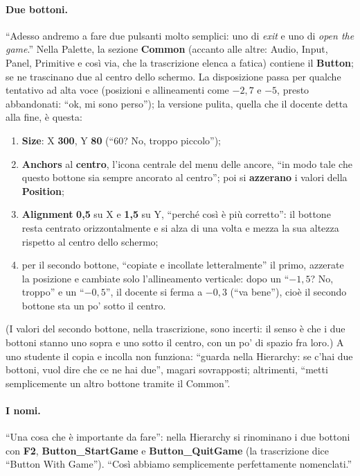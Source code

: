 \paragraph{Due bottoni.} ``Adesso andremo a fare due pulsanti molto semplici: uno di
\emph{exit} e uno di \emph{open the game}.'' Nella Palette, la sezione
\textbf{Common} (accanto alle altre: Audio, Input, Panel, Primitive e così via, che la
trascrizione elenca a fatica) contiene il \textbf{Button}; se ne trascinano due al centro
dello schermo. La disposizione passa per qualche tentativo ad alta voce (posizioni e
allineamenti come $-2{,}7$ e $-5$, presto abbandonati: ``ok, mi sono perso''); la versione
pulita, quella che il docente detta alla fine, è questa:
\begin{enumerate}
  \item \textbf{Size}: X \textbf{300}, Y \textbf{80} (``60? No, troppo piccolo'');
  \item \textbf{Anchors} al \textbf{centro}, l'icona centrale del menu delle ancore, ``in
        modo tale che questo bottone sia sempre ancorato al centro''; poi si
        \textbf{azzerano} i valori della \textbf{Position};
  \item \textbf{Alignment} \textbf{0,5} su X e \textbf{1,5} su Y, ``perché così è più
        corretto'': il bottone resta centrato orizzontalmente e si alza di una volta e
        mezza la sua altezza rispetto al centro dello schermo;
  \item per il secondo bottone, ``copiate e incollate letteralmente'' il primo, azzerate
        la posizione e cambiate solo l'allineamento verticale: dopo un ``$-1{,}5$? No,
        troppo'' e un ``$-0{,}5$'', il docente si ferma a \textbf{$-0{,}3$} (``va bene''),
        cioè il secondo bottone sta un po' sotto il centro.
\end{enumerate}
(I valori del secondo bottone, nella trascrizione, sono incerti: il senso è che i due
bottoni stanno uno sopra e uno sotto il centro, con un po' di spazio fra loro.) A uno
studente il copia e incolla non funziona: ``guarda nella Hierarchy: se c'hai due bottoni,
vuol dire che ce ne hai due'', magari sovrapposti; altrimenti, ``metti semplicemente un
altro bottone tramite il Common''.

\paragraph{I nomi.} ``Una cosa che è importante da fare'': nella Hierarchy si rinominano i
due bottoni con \textbf{F2}, \textbf{Button\_StartGame} e \textbf{Button\_QuitGame} (la
trascrizione dice ``Button With Game''). ``Così abbiamo semplicemente perfettamente
nomenclati.''

